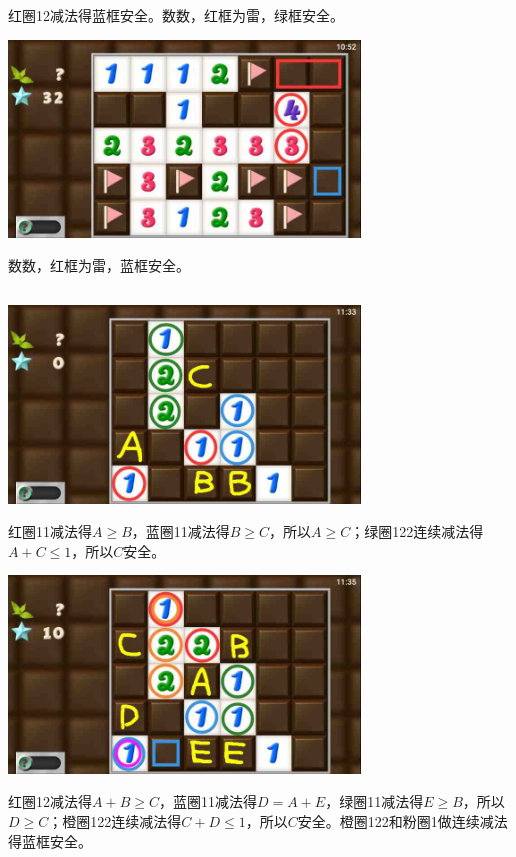 红圈12减法得蓝框安全。数数，红框为雷，绿框安全。
\begin{center}
    \includegraphics[width=0.7\textwidth]{puzzlelow/222-5.jpg}
\end{center}
数数，红框为雷，蓝框安全。

\subsection{} %
\begin{center}
    \includegraphics[width=0.7\textwidth]{puzzlelow/224-1.jpg}
\end{center}
红圈11减法得$A\ge B$，蓝圈11减法得$B\ge C$，所以$A\ge C$；绿圈122连续减法得$A+C\le 1$，所以$C$安全。
\begin{center}
    \includegraphics[width=0.7\textwidth]{puzzlelow/224-2.jpg}
\end{center}
红圈12减法得$A+B\ge C$，蓝圈11减法得$D=A+E$，绿圈11减法得$E\ge B$，所以$D\ge C$；橙圈122连续减法得$C+D\le 1$，所以$C$安全。橙圈122和粉圈1做连续减法得蓝框安全。
